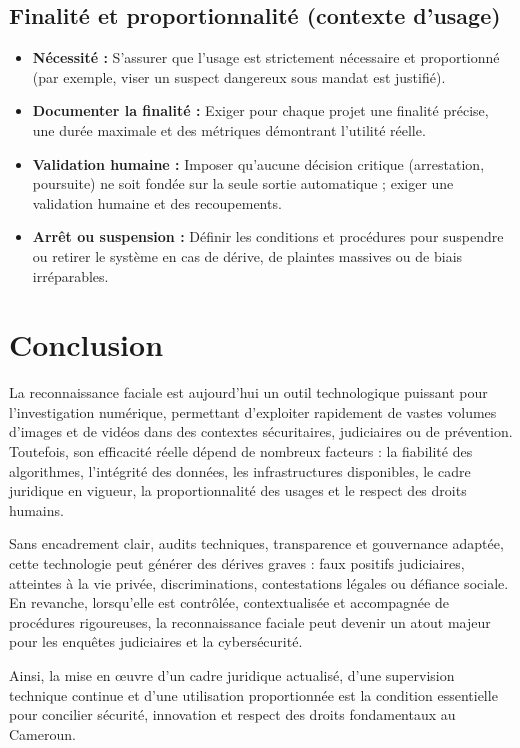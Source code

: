 \documentclass[11pt,a4paper]{article}
\begin{document}
	\subsection{Finalité et proportionnalité (contexte d’usage)}
	\begin{itemize}
		\item \textbf{Nécessité :} S’assurer que l’usage est strictement nécessaire et proportionné (par exemple, viser un suspect dangereux sous mandat est justifié).
		\item \textbf{Documenter la finalité :} Exiger pour chaque projet une finalité précise, une durée maximale et des métriques démontrant l’utilité réelle.
		\item \textbf{Validation humaine :} Imposer qu’aucune décision critique (arrestation, poursuite) ne soit fondée sur la seule sortie automatique ; exiger une validation humaine et des recoupements.
		\item \textbf{Arrêt ou suspension :} Définir les conditions et procédures pour suspendre ou retirer le système en cas de dérive, de plaintes massives ou de biais irréparables.
	\end{itemize}
	
	\newpage
	
	\section*{\Huge Conclusion}
	\vspace{0.5cm}
	La reconnaissance faciale est aujourd’hui un outil technologique puissant pour l’investigation numérique, permettant d’exploiter rapidement de vastes volumes d’images et de vidéos dans des contextes sécuritaires, judiciaires ou de prévention. Toutefois, son efficacité réelle dépend de nombreux facteurs : la fiabilité des algorithmes, l’intégrité des données, les infrastructures disponibles, le cadre juridique en vigueur, la proportionnalité des usages et le respect des droits humains.
	
	Sans encadrement clair, audits techniques, transparence et gouvernance adaptée, cette technologie peut générer des dérives graves : faux positifs judiciaires, atteintes à la vie privée, discriminations, contestations légales ou défiance sociale. En revanche, lorsqu’elle est contrôlée, contextualisée et accompagnée de procédures rigoureuses, la reconnaissance faciale peut devenir un atout majeur pour les enquêtes judiciaires et la cybersécurité.
	
	Ainsi, la mise en œuvre d’un cadre juridique actualisé, d’une supervision technique continue et d’une utilisation proportionnée est la condition essentielle pour concilier sécurité, innovation et respect des droits fondamentaux au Cameroun.
\end{document}
